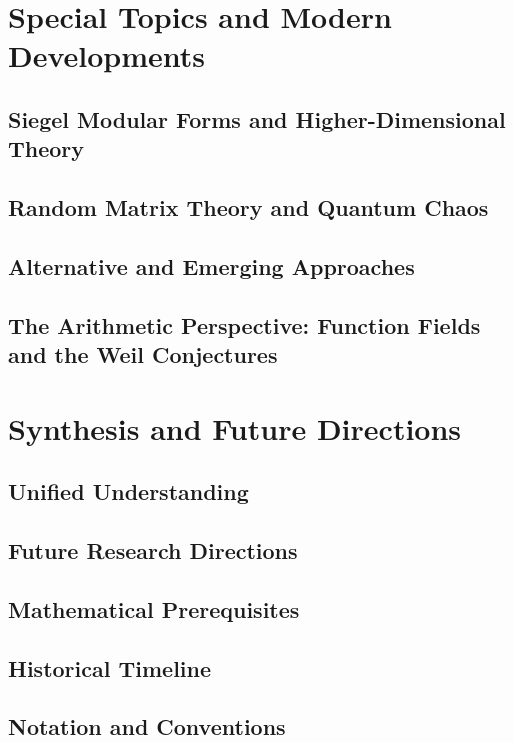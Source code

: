 \documentclass[12pt,a4paper,twoside]{book}
\theoremstyle{plain}
\theoremstyle{definition}
\theoremstyle{remark}
\begin{document}
\part{Special Topics and Modern Developments}

\chapter{Siegel Modular Forms and Higher-Dimensional Theory}
\label{ch:siegel}


\chapter{Random Matrix Theory and Quantum Chaos}
\label{ch:random_matrix}


\chapter{Alternative and Emerging Approaches}
\label{ch:alternative}


\chapter{The Arithmetic Perspective: Function Fields and the Weil Conjectures}
\label{ch:function_fields}


\part{Synthesis and Future Directions}

\chapter{Unified Understanding}
\label{ch:unified}


\chapter{Future Research Directions}
\label{ch:future}


\appendix

\chapter{Mathematical Prerequisites}
\label{app:prerequisites}


\chapter{Historical Timeline}
\label{app:timeline}


\chapter{Notation and Conventions}
\label{app:notation}


\backmatter

\printbibliography[heading=bibintoc,title={Bibliography}]

\printindex
\end{document}
